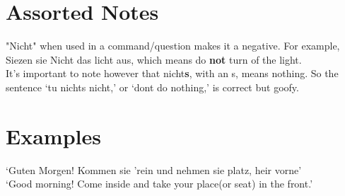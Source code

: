 \documentclass{article}
\begin{document}
\section{Assorted Notes}
"Nicht" when used in a command/question makes it a negative. For example, Siezen sie Nicht das licht aus, which means do \textbf{not} turn of the light. \\

It's important to note however that nicht\textbf{s}, with an s, means nothing. So the sentence `tu nichts nicht,' or `dont do nothing,' is correct but goofy.

\section{Examples}

`Guten Morgen! Kommen sie 'rein und nehmen sie platz, heir vorne'\\
`Good morning! Come inside and take your place(or seat) in the front.'
\end{document}
